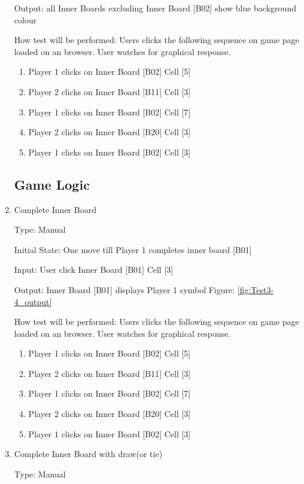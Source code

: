 \documentclass[12pt, titlepage]{article}
\begin{document}
\begin{enumerate}
Output:  all Inner Boards excluding Inner Board [B02] show blue background colour
					
How test will be performed: Users clicks the following sequence on game page
loaded on an browser. User watches for graphical response.
\begin{enumerate}
	\item Player 1 clicks on Inner Board [B02] Cell [5]
	\item Player 2 clicks on Inner Board [B11] Cell [3]
	\item Player 1 clicks on Inner Board [B02] Cell [7]
	\item Player 2 clicks on Inner Board [B20] Cell [3]
	\item Player 1 clicks on Inner Board [B02] Cell [3]
\end{enumerate}


\subsection{Game Logic}

\item{Complete Inner Board\\}

Type: Manual
					
Initial State: One move till Player 1 completes inner board [B01]
					
Input: User click Inner Board [B01] Cell [3] 
					
Output:  Inner Board [B01] displays Player 1 symbol Figure: \ref{fig:Test3-4_output}
					
How test will be performed: Users clicks the following sequence on game page
loaded on an browser. User watches for graphical response.
\begin{enumerate}
	\item Player 1 clicks on Inner Board [B02] Cell [5]
	\item Player 2 clicks on Inner Board [B11] Cell [3]
	\item Player 1 clicks on Inner Board [B02] Cell [7]
	\item Player 2 clicks on Inner Board [B20] Cell [3]
	\item Player 1 clicks on Inner Board [B02] Cell [3]
\end{enumerate}

\item{Complete Inner Board with draw(or tie) \\}

Type: Manual
					

\end{enumerate}
\end{document}
